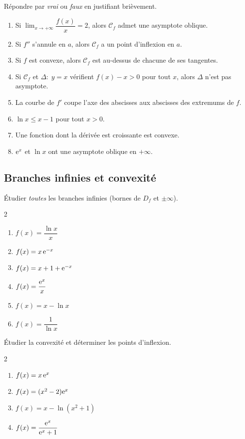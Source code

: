 Répondre par \emph{vrai} ou \emph{faux} en justifiant brièvement.
\begin{enumerate}
	\item Si $\displaystyle\lim_{x\to+\infty}\dfrac{f(x)}{x}=2$, alors
	$\mathcal C_f$ admet une asymptote oblique.
	\item Si $f''$ s'annule en $a$, alors $\mathcal C_f$ a un point d'inflexion
	en $a$.
	\item Si $f$ est convexe, alors $\mathcal C_f$ est au-dessus de chacune de
	ses tangentes.
	\item Si $\mathcal C_f$ et $\Delta:\;y=x$ vérifient $f(x)-x>0$ pour tout $x$,
	alors $\Delta$ n'est pas asymptote.
	\item La courbe de $f'$ coupe l'axe des abscisses aux abscisses des
	extremums de $f$.
	\item $\ln x\leq x-1$ pour tout $x>0$.
	\item Une fonction dont la dérivée est croissante est convexe.
	\item $\mathrm{e}^{x}$ et $\ln x$ ont une asymptote oblique en $+\infty$.
\end{enumerate}

\subsection{Branches infinies et convexité}

Étudier \emph{toutes} les branches infinies (bornes de $D_f$ et $\pm\infty$).
\begin{multicols}{2}
\begin{enumerate}
	\item $f(x)=\dfrac{\ln x}{x}$
	\item $f(x)=x\,\mathrm{e}^{-x}$
	\item $f(x)=x+1+\mathrm{e}^{-x}$
	\item $f(x)=\dfrac{\mathrm{e}^{x}}{x}$
	\item $f(x)=x-\ln x$
	\item $f(x)=\dfrac{1}{\ln x}$
\end{enumerate}
\end{multicols}

Étudier la convexité et déterminer les points d'inflexion.
\begin{multicols}{2}
\begin{enumerate}
	\item $f(x)=x\,\mathrm{e}^{x}$
	\item $f(x)=(x^{2}-2)\mathrm{e}^{x}$
	\item $f(x)=x-\ln(x^{2}+1)$
	\item $f(x)=\dfrac{\mathrm{e}^{x}}{\mathrm{e}^{x}+1}$
\end{enumerate}
\end{multicols}

